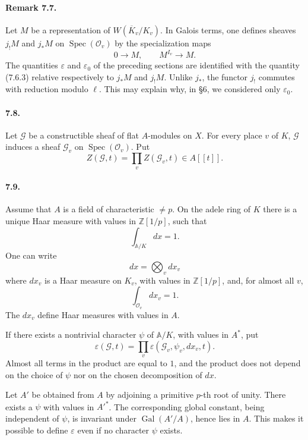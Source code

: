 \documentclass[10pt,letterpaper]{article}
\newcommand{\Gal}{\operatorname{Gal}}
\newcommand{\Spec}{\operatorname{Spec}}
\providecommand{\Spec}{\operatorname{Spec}}
\providecommand{\Gal}{\operatorname{Gal}}
\providecommand{\Gal}{\operatorname{Gal}}
\providecommand{\Spec}{\operatorname{Spec}}
\providecommand{\Spec}{\operatorname{Spec}}
\providecommand{\Gal}{\operatorname{Gal}}
\providecommand{\Gal}{\operatorname{Gal}}
\begin{document}
\paragraph{Remark 7.7.} Let \(M\) be a representation of \(W(\overline K_v/K_v)\). In Galois terms, one defines sheaves \(j_!M\) and \(j_*M\) on \(\Spec(\mathcal O_v)\) by the specialization maps
\[
0\longrightarrow M,
\qquad
M^{I_v}\longrightarrow M.
\]
The quantities \(\varepsilon\) and \(\varepsilon_0\) of the preceding sections are identified with the quantity (7.6.3) relative respectively to \(j_*M\) and \(j_!M\). Unlike \(j_*\), the functor \(j_!\) commutes with reduction modulo \(\ell\). This may explain why, in §6, we considered only \(\varepsilon_0\).

\paragraph{7.8.} Let \(\mathcal G\) be a constructible sheaf of flat \(A\)-modules on \(X\). For every place \(v\) of \(K\), \(\mathcal G\) induces a sheaf \(\mathcal G_v\) on \(\Spec(\mathcal O_v)\). Put
\[
\tag{7.8.1}
Z(\mathcal G,t)=\prod_v Z(\mathcal G_v,t)\in A[[t]].
\]

\paragraph{7.9.} Assume that \(A\) is a field of characteristic \(\ne p\). On the adele ring of \(K\) there is a unique Haar measure with values in \(\mathbb Z[1/p]\), such that
\[
\int_{\mathbb A/K}dx=1.
\]
One can write
\[
dx=\bigotimes_v dx_v
\]
where \(dx_v\) is a Haar measure on \(K_v\), with values in \(\mathbb Z[1/p]\), and, for almost all \(v\),
\[
\int_{\mathcal O_v}dx_v=1.
\]
The \(dx_v\) define Haar measures with values in \(A\).

If there exists a nontrivial character \(\psi\) of \(\mathbb A/K\), with values in \(A^*\), put
\[
\tag{7.9.1}
\varepsilon(\mathcal G,t)=\prod_v
\varepsilon(\mathcal G_v,\psi_v,dx_v,t).
\]
Almost all terms in the product are equal to \(1\), and the product does not depend on the choice of \(\psi\) nor on the chosen decomposition of \(dx\).

Let \(A'\) be obtained from \(A\) by adjoining a primitive \(p\)-th root of unity. There exists a \(\psi\) with values in \(A'^*\). The corresponding global constant, being independent of \(\psi\), is invariant under \(\Gal(A'/A)\), hence lies in \(A\). This makes it possible to define \(\varepsilon\) even if no character \(\psi\) exists.
\end{document}
